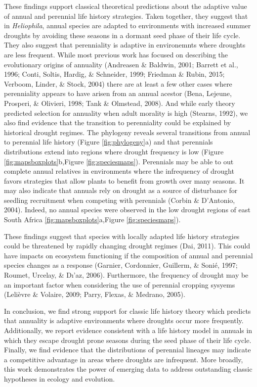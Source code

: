 \documentclass[man,floatsintext]{apa6}
\theoremstyle{definition}
\theoremstyle{definition}
\theoremstyle{definition}
\theoremstyle{remark}
\begin{document}
These findings support classical theoretical predictions about the
adaptive value of annual and perennial life history strategies. Taken
together, they suggest that in \emph{Heliophila}, annual species are
adapted to environments with increased summer droughts by avoiding these
seasons in a dormant seed phase of their life cycle. They also suggest
that perenniality is adaptive in environemnts where droughts are less
frequent. While most previous work has focused on describing the
evolutionary origins of annuality (Andreasen \& Baldwin, 2001; Barrett
et al., 1996; Conti, Soltis, Hardig, \& Schneider, 1999; Friedman \&
Rubin, 2015; Verboom, Linder, \& Stock, 2004) there are at least a few
other cases where perenniality appears to have arisen from an annual
acestor (Bena, Lejeune, Prosperi, \& Olivieri, 1998; Tank \& Olmstead,
2008). And while early theory predicted selection for annuality when
adult morality is high (Stearns, 1992), we also find evidence that the
transition to perenniality could be explained by historical drought
regimes. The phylogeny reveals several transitions from annual to
perennial life history (Figure \ref{fig:phylogeny}a) and that perennials
distributions extend into regions where drought frequency is low (Figure
\ref{fig:mapsboxplots}b,Figure \ref{fig:speciesmaps}). Perennials may be
able to out complete annual relatives in environments where the
infrequency of drought favors strategies that allow plants to benefit
from growth over many seasons. It may also indicate that annuals rely on
drought as a source of disturbance for seedling recruitment when
competing with perennials (Corbin \& D'Antonio, 2004). Indeed, no annual
species were observed in the low drought regions of east South Africa
\ref{fig:mapsboxplots}a,Figure \ref{fig:speciesmaps}).

These findings suggest that species with locally adapted life history
strategies could be threatened by rapidly changing drought regimes (Dai,
2011). This could have impacts on ecosystem functioning if the
composition of annual and perennial species changes as a response
(Garnier, Cordonnier, Guillerm, \& Sonié, 1997; Roumet, Urcelay, \&
Dı'az, 2006). Furthermore, the frequency of drought may be an important
factor when considering the use of perennial cropping sysyems (Lelièvre
\& Volaire, 2009; Parry, Flexas, \& Medrano, 2005).

In conclusion, we find strong support for classic life history theory
which predicts that annuality is adaptive environments where droughts
occur more frequently. Additionally, we report evidence consistent with
a life history model in annuals in which they escape drought prone
seasons during the seed phase of their life cycle. Finally, we find
evidence that the distributions of perennial lineages may indicate a
competitive advantage in areas where droughts are infrequent. More
broadly, this work demonstrates the power of emerging data to address
outstanding classic hypotheses in ecology and evolution.
\end{document}
